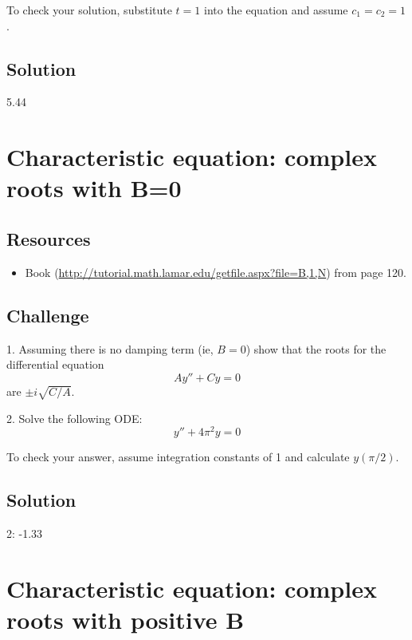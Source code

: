 To check your solution, substitute $t=1$ into the equation and assume $c_1 = c_2 = 1$.

\subsection*{Solution}
5.44 %




\newpage
\section{Characteristic equation: complex roots with B=0}

\subsection*{Resources}
\begin{itemize}
    \item Book (\url{http://tutorial.math.lamar.edu/getfile.aspx?file=B,1,N}) from page 120.
\end{itemize}

\subsection*{Challenge}
1. Assuming there is no damping term (ie, $B=0$) show that the roots for the differential equation
\begin{equation}
    A y'' + Cy = 0
\end{equation}
are $\pm i \sqrt{C/A}$.

2. Solve the following ODE:
\begin{equation}
    \label{eq:cecr}
    y'' + 4 \pi^2 y = 0
\end{equation}

To check your answer, assume integration constants of 1 and calculate $y(\pi/2)$. %

\subsection*{Solution}
2: -1.33




\newpage
\section{Characteristic equation: complex roots with positive B}

